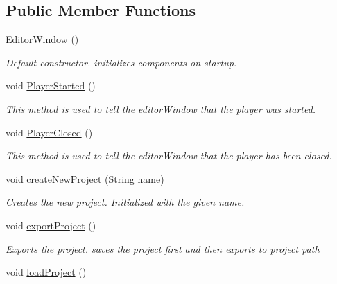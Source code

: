 \subsection*{Public Member Functions}
\begin{DoxyCompactItemize}
\item 
\hypertarget{class_a_rdev_kit_1_1_editor_window_aceeacbdb108a82c59f88194a3d4e396c}{\hyperlink{class_a_rdev_kit_1_1_editor_window_aceeacbdb108a82c59f88194a3d4e396c}{Editor\-Window} ()}\label{class_a_rdev_kit_1_1_editor_window_aceeacbdb108a82c59f88194a3d4e396c}

\begin{DoxyCompactList}\small\item\em Default constructor. initializes components on startup. \end{DoxyCompactList}\item 
void \hyperlink{class_a_rdev_kit_1_1_editor_window_a0df48f7d107d823f50799886bd99c1ee}{Player\-Started} ()
\begin{DoxyCompactList}\small\item\em This method is used to tell the editor\-Window that the player was started. \end{DoxyCompactList}\item 
void \hyperlink{class_a_rdev_kit_1_1_editor_window_a03fe5bc5b9e383b895fa1a30faf48301}{Player\-Closed} ()
\begin{DoxyCompactList}\small\item\em This method is used to tell the editor\-Window that the player has been closed. \end{DoxyCompactList}\item 
void \hyperlink{class_a_rdev_kit_1_1_editor_window_afe0bf240a814370f5b119be462a1acec}{create\-New\-Project} (String name)
\begin{DoxyCompactList}\small\item\em Creates the new project. Initialized with the given name. \end{DoxyCompactList}\item 
void \hyperlink{class_a_rdev_kit_1_1_editor_window_a0ae113d771fc8a03dcf53016a54345d4}{export\-Project} ()
\begin{DoxyCompactList}\small\item\em Exports the project. saves the project first and then exports to project path \end{DoxyCompactList}\item 
void \hyperlink{class_a_rdev_kit_1_1_editor_window_a5225f8ebee27d368578165c43f826899}{load\-Project} ()

\end{DoxyCompactItemize}
